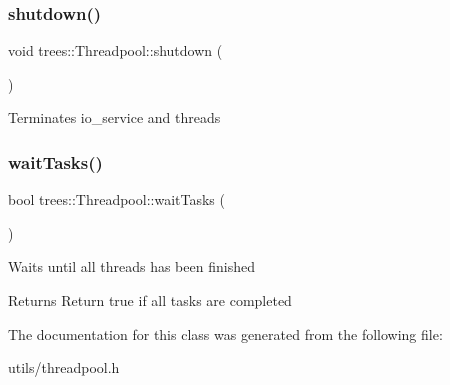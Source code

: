 \subsubsection{\texorpdfstring{shutdown()}{shutdown()}}
{\footnotesize\ttfamily void trees\+::\+Threadpool\+::shutdown (\begin{DoxyParamCaption}{ }\end{DoxyParamCaption})\hspace{0.3cm}{\ttfamily [inline]}}

Terminates io\+\_\+service and threads \mbox{\label{classtrees_1_1_threadpool_a5675fede770bf61c78cdd2d0250acc93}} 
\subsubsection{\texorpdfstring{wait\+Tasks()}{waitTasks()}}
{\footnotesize\ttfamily bool trees\+::\+Threadpool\+::wait\+Tasks (\begin{DoxyParamCaption}{ }\end{DoxyParamCaption})\hspace{0.3cm}{\ttfamily [inline]}}

Waits until all threads has been finished

\begin{DoxyReturn}{Returns}
Return true if all tasks are completed 
\end{DoxyReturn}


The documentation for this class was generated from the following file\+:\begin{DoxyCompactItemize}
\item 
utils/threadpool.\+h\end{DoxyCompactItemize}
